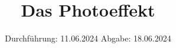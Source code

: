 

\subject{V500}
\title{Das Photoeffekt}
\date{%
  Durchführung: 11.06.2024
  \hspace{3em}
  Abgabe: 18.06.2024
}



\maketitle
\thispagestyle{empty}
\tableofcontents
\newpage






\printbibliography{}
\appendix
\setcounter{secnumdepth}{0}

